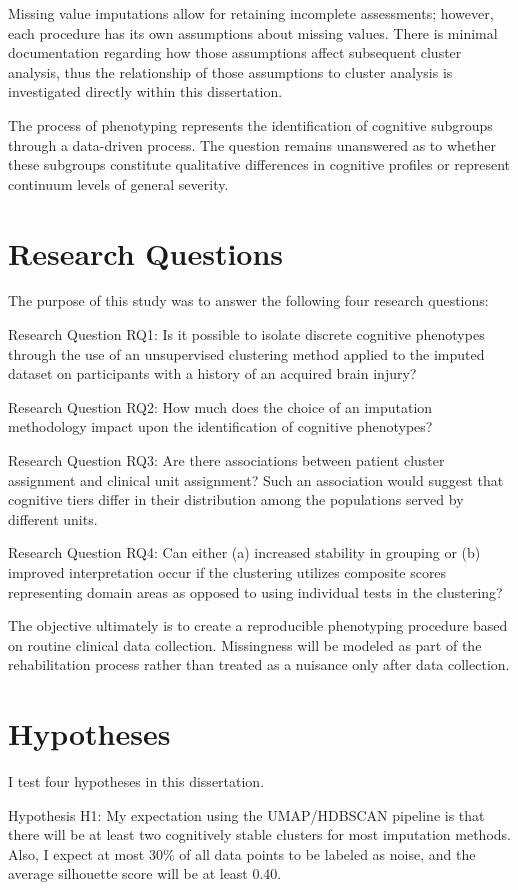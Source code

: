 Missing value imputations allow for retaining incomplete assessments; however, each procedure has its own assumptions about missing values. There is minimal documentation regarding how those assumptions affect subsequent cluster analysis, thus the relationship of those assumptions to cluster analysis is investigated directly within this dissertation.

The process of phenotyping represents the identification of cognitive subgroups through a data-driven process. The question remains unanswered as to whether these subgroups constitute qualitative differences in cognitive profiles or represent continuum levels of general severity.

\section{Research Questions}
The purpose of this study was to answer the following four research questions:

Research Question RQ1: Is it possible to isolate discrete cognitive phenotypes through the use of an unsupervised clustering method applied to the imputed dataset on participants with a history of an acquired brain injury?

Research Question RQ2: How much does the choice of an imputation methodology impact upon the identification of cognitive phenotypes?

Research Question RQ3: Are there associations between patient cluster assignment and clinical unit assignment? Such an association would suggest that cognitive tiers differ in their distribution among the populations served by different units.

Research Question RQ4: Can either (a) increased stability in grouping or (b) improved interpretation occur if the clustering utilizes composite scores representing domain areas as opposed to using individual tests in the clustering?

The objective ultimately is to create a reproducible phenotyping procedure based on routine clinical data collection. Missingness will be modeled as part of the rehabilitation process rather than treated as a nuisance only after data collection.

\section{Hypotheses}
I test four hypotheses in this dissertation.

Hypothesis H1: My expectation using the UMAP/HDBSCAN pipeline is that there will be at least two cognitively stable clusters for most imputation methods. Also, I expect at most 30\% of all data points to be labeled as noise, and the average silhouette score will be at least 0.40.

